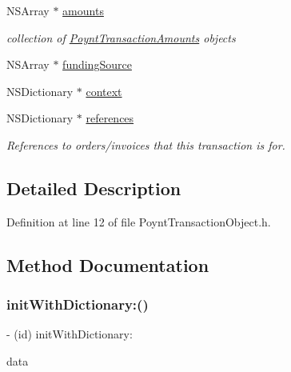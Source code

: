\begin{DoxyCompactItemize}
N\+S\+Array $\ast$ \hyperlink{interface_poynt_transaction_object_a5ab449d070271ee2c9d138bb7b472a6c}{amounts}
\begin{DoxyCompactList}\small\item\em collection of \hyperlink{interface_poynt_transaction_amounts}{Poynt\+Transaction\+Amounts} objects \end{DoxyCompactList}\item 
N\+S\+Array $\ast$ \hyperlink{interface_poynt_transaction_object_ab4cac3360e86d21570d89915c99e6943}{funding\+Source}
\item 
N\+S\+Dictionary $\ast$ \hyperlink{interface_poynt_transaction_object_a97674af3143e04f09bbc6590dab812d7}{context}
\item 
N\+S\+Dictionary $\ast$ \hyperlink{interface_poynt_transaction_object_a2bdc3d5a4da018a352f33b946a0ea384}{references}
\begin{DoxyCompactList}\small\item\em References to orders/invoices that this transaction is for. \end{DoxyCompactList}\end{DoxyCompactItemize}


\subsection{Detailed Description}


Definition at line 12 of file Poynt\+Transaction\+Object.\+h.



\subsection{Method Documentation}
\hypertarget{interface_poynt_transaction_object_a777cf6da1ae0fc9452b06142a5adaa14}{}\label{interface_poynt_transaction_object_a777cf6da1ae0fc9452b06142a5adaa14} 
\subsubsection{\texorpdfstring{init\+With\+Dictionary\+:()}{initWithDictionary:()}}
{\footnotesize\ttfamily -\/ (id) init\+With\+Dictionary\+: \begin{DoxyParamCaption}\item[{(N\+S\+Dictionary $\ast$)}]{data }\end{DoxyParamCaption}}

